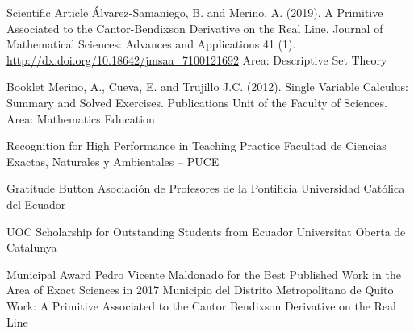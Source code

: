 \documentclass[
    a4paper,
    maincolor=cvblue!70!blue,
    sidecolor=gray!30,
    sectioncolor=cvblue!70!blue,
    sidebarwidth=7.5cm,
    topbottommargin=20pt,
    leftrightmargin=20pt,
]{fortysecondscv}
\begin{document}
    {Scientific Article}
    {Álvarez-Samaniego, B. and Merino, A. (2019). A Primitive Associated to the Cantor-Bendixson Derivative on the Real Line. Journal of Mathematical Sciences: Advances and Applications 41 (1).}     
    {\url{http://dx.doi.org/10.18642/jmsaa_7100121692}}
    {Area: Descriptive Set Theory}
    
    {Booklet}
    {Merino, A., Cueva, E. and Trujillo J.C. (2012). Single Variable Calculus: Summary and Solved Exercises. Publications Unit of the Faculty of Sciences.}
    {}
    {Area: Mathematics Education}
    



    {Recognition for High Performance in Teaching Practice}
    {Facultad de Ciencias Exactas, Naturales y Ambientales – PUCE}
    {}

    {Gratitude Button}
    {Asociación de Profesores de la Pontificia Universidad Católica del Ecuador}
    {}

    {UOC Scholarship for Outstanding Students from Ecuador}
    {Universitat Oberta de Catalunya}
    {}
    
    {Municipal Award Pedro Vicente Maldonado for the Best Published Work in the Area of Exact Sciences in 2017}
    {Municipio del Distrito Metropolitano de Quito}
    {Work: A Primitive Associated to the Cantor Bendixson Derivative on the Real Line}
    

\end{document}
